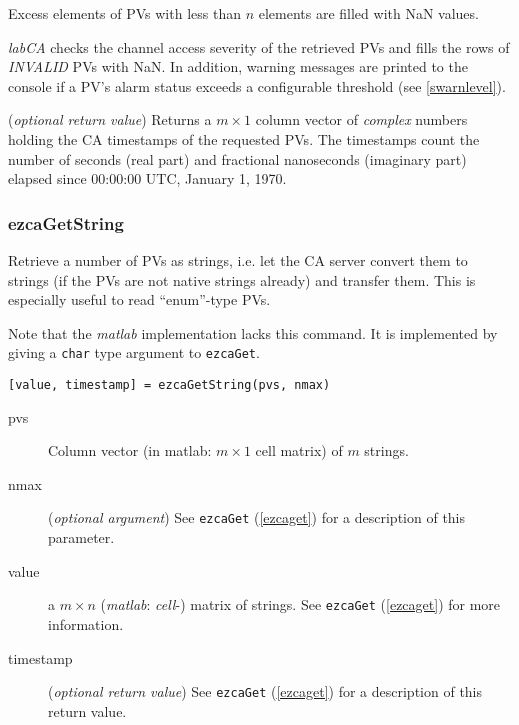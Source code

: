 \documentclass{article}
\newcommand{\sca}{{\em labCA}}
\newcommand{\matlab}{{\em matlab}}
\newcommand{\com}[1]{{\tt #1}}
\newcommand{\NAN}{\mbox{NaN}}
\newcommand{\PVITEM}{
\item[pvs] Column vector (in matlab: $m\times 1$ cell matrix)
of $m$ strings.
}
\begin{document}
\begin{description}
Excess elements of PVs with less than $n$ elements are filled with
\NAN{} values.

\sca{} checks the channel access severity of the retrieved PVs and
fills the rows of {\em INVALID} PVs with \NAN. In addition, warning
messages are printed to the console if a PV's alarm status exceeds
a configurable threshold (see \ref{swarnlevel}).
%
%
\item[timestamp] ({\em optional return value}) Returns a $m\times 1$
column vector of {\em complex} numbers holding the CA timestamps of
the requested PVs. The timestamps count the number of seconds (real part)
and fractional nanoseconds (imaginary part) elapsed since
00:00:00 UTC, January 1, 1970.
\end{description}

\subsubsection{ezcaGetString}
\label{getstring}
Retrieve a number of PVs as strings, i.e. let the CA server convert
them to strings (if the PVs are not native strings already) and transfer
them. This is especially useful to read ``enum''-type PVs.

Note that the \matlab{} implementation lacks this command. It is implemented
by giving a \com{char}{} type argument to \com{ezcaGet}.
\begin{verbatim}
[value, timestamp] = ezcaGetString(pvs, nmax)
\end{verbatim}
\begin{description}
\PVITEM
%
%
\item[nmax] ({\em optional argument})
See \com{ezcaGet}{} (\ref{ezcaget}) for a description of this parameter.
\item[value] a $m\times n$ (\matlab: {\em cell}-) matrix of strings. See \com{ezcaGet}{}
(\ref{ezcaget}) for more information.
\item[timestamp] ({\em optional return value})
See \com{ezcaGet}{} (\ref{ezcaget}) for a description of this return value.
\end{description}
\end{document}
